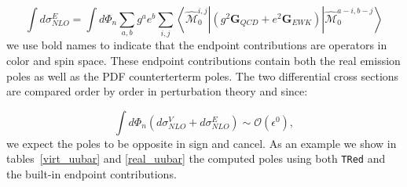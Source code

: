 \documentclass[a4paper]{article}
\def \TRed{\texttt{TRed} }
\def \MBra#1#2#3{\left<\hat{\mathcal{M}}_{#1}^{#2,#3}\right|}
\def \MKet#1#2#3{\left|\hat{\mathcal{M}}_{#1}^{#2,#3}\right>}
\begin{document}
\begin{equation}
 \int d\sigma^E_{NLO} = \int d\Phi_{n}
 \sum_{a,b} g^{a} e^{b} 
 \sum_{i,j}
 \MBra{0}{i}{j}
 \left(
 g^2\textbf{G}_{QCD}
 +
 e^2\textbf{G}_{EWK}
 \right)
 \MKet{0}{a-i}{b-j}
\end{equation}
we use bold names to indicate that the endpoint contributions are operators in color and spin space. 
These endpoint contributions contain both the real emission poles as well as the PDF counterterterm poles.
The two differential cross sections are compared order by order in perturbation theory and since:

\begin{equation}
 \int d\Phi_n \left(d\sigma_{NLO}^V + d\sigma_{NLO}^E\right) \sim \mathcal{O}(\epsilon^0),
 \label{cancellation}
\end{equation}
we expect the poles to be opposite in sign and cancel. As an example we show in tables~\ref{virt_uubar} and  \ref{real_uubar} the computed poles using both \TRed and the built-in endpoint contributions. 
\end{document}
